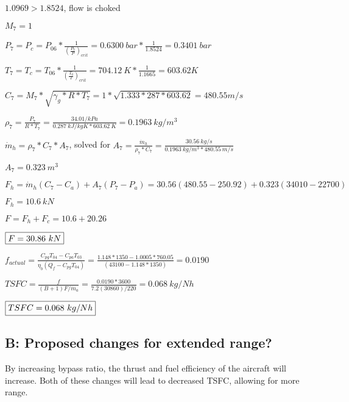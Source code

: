 \documentclass{article}
\begin{document}
$1.0969>1.8524$, flow is choked

$M_7=1$

$P_7=P_c=P_{06}*\frac{1}{(\frac{P_0}{P})_{crit}}=0.6300\ bar*\frac{1}{1.8524}=0.3401\ bar$\

$T_7=T_c=T_{06}*\frac{1}{(\frac{T_0}{T})_{crit}}=704.12\ K*\frac{1}{1.1665}=603.62K$

$C_7=M_7*\sqrt{\gamma_g*R*T_7}=1*\sqrt{1.333*287*603.62}=480.55 m/s$

$\rho_7=\frac{P_7}{R*T_7}=\frac{34.01/ kPa}{0.287\ kJ/kgK*603.62\ K}=0.1963\ kg/m^3$

$\dot{m}_h=\rho_7*C_7*A_7$, solved for $A_7=\frac{\dot{m}_h}{\rho_7*C_7}=\frac{30.56\ kg/s}{0.1963\ kg/m^3*480.55\ m/s}$

$A_7=0.323\ m^3$

$F_h=\dot{m}_h(C_7-C_a)+A_7(P_7-P_a)=30.56(480.55-250.92)+0.323(34010-22700)$

$F_h=10.6\ kN$

$F=F_h+F_c=10.6+20.26$

$\fbox{$F=30.86\ kN$}$

$f_{actual}=\frac{C_{pg}T_{04}-C_{pa}T_{03}}{\eta_b (Q_f-C_{pg}T_{04})}=\frac{1.148*1350-1.0005*760.05}{ (43100-1.148*1350)}=0.0190$

$TSFC=\frac{f}{(B+1)F/\dot{m}_a}=\frac{0.0190*3600}{7.2(30860)/220}=0.068\ kg/Nh$

$\fbox{$TSFC=0.068\ kg/Nh$}$

\subsection*{B: Proposed changes for extended range?}

By increasing bypass ratio, the thrust and fuel efficiency 
of the aircraft will increase. Both of these changes will 
lead to decreased TSFC, allowing for more range.
\end{document}
